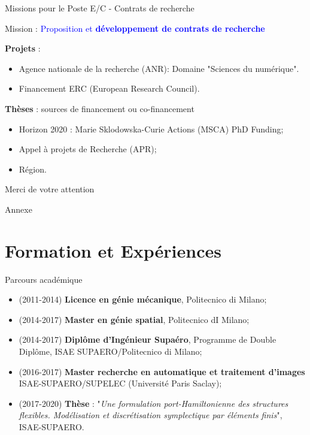 \documentclass[aspectratio=169, french]{beamer}
\begin{document}
\begin{frame}{Missions pour le Poste E/C - Contrats de recherche}	
\begin{tcolorbox}
Mission : \textcolor{blue}{Proposition et \textbf{développement de contrats de recherche}}
\end{tcolorbox}
\textbf{Projets} : 
\begin{itemize}
	\item Agence nationale de la recherche (ANR): Domaine "Sciences du numérique".
	\item Financement ERC (European Research Council).
\end{itemize}

\textbf{Thèses} : sources de financement ou co-financement
\begin{itemize}
\item Horizon 2020 : Marie Sklodowska-Curie Actions (MSCA) PhD Funding;
\item Appel à projets de Recherche (APR);
\item Région.
\end{itemize}

\end{frame}

\begin{frame}{}
	\centering
	\Large Merci de votre attention
\end{frame}

\appendix

\begin{frame}{}
	\centering
	\Huge{Annexe}
\end{frame}

\section{Formation et Expériences}

\begin{frame}{Parcours académique}
\begin{itemize}
	\item (2011-2014) \textbf{Licence en génie mécanique}, Politecnico di Milano;
	\item (2014-2017) \textbf{Master en génie spatial}, Politecnico dI Milano;
	\item (2014-2017) \textbf{Diplôme d’Ingénieur Supaéro}, Programme de
	Double Diplôme, ISAE SUPAERO/Politecnico di Milano;
	\item (2016-2017) \textbf{Master recherche en automatique et traitement d’images
	} ISAE-SUPAERO/SUPELEC (Université Paris Saclay);
	\item (2017-2020) \textbf{Thèse} : "\textit{Une formulation port-Hamiltonienne des structures flexibles. Modélisation et discrétisation symplectique par éléments finis}", ISAE-SUPAERO.
\end{itemize}
\end{frame}
\end{document}
